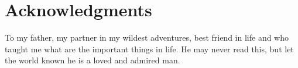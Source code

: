 \section*{Acknowledgments}

To my father, my partner in my wildest adventures, best friend in life and who taught me what are the important things in life. He may never read this, but let the world known he is a loved and admired man.


